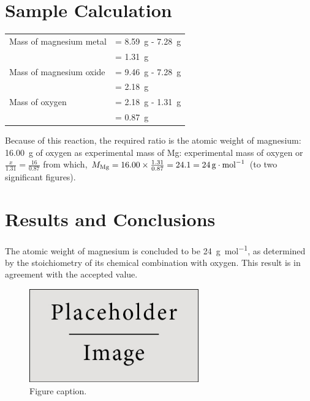 \documentclass{article}
\begin{document}
\section{Sample Calculation}

\begin{tabular}{ll}
Mass of magnesium metal & = \SI{8.59}{\gram} - \SI{7.28}{\gram}\\
& = \SI{1.31}{\gram}\\
Mass of magnesium oxide & = \SI{9.46}{\gram} - \SI{7.28}{\gram}\\
& = \SI{2.18}{\gram}\\
Mass of oxygen & = \SI{2.18}{\gram} - \SI{1.31}{\gram}\\
& = \SI{0.87}{\gram}
\end{tabular}

Because of this reaction, the required ratio is the atomic weight of magnesium: \SI{16.00}{\gram} of oxygen as experimental mass of Mg: experimental mass of oxygen or $\frac{x}{1.31}=\frac{16}{0.87}$ from which, $M_{\ce{Mg}} = 16.00 \times \frac{1.31}{0.87} = 24.1 = \SI{24}{\gram\per\mole}$ (to two significant figures).


\section{Results and Conclusions}

The atomic weight of magnesium is concluded to be \SI{24}{\gram\per\mol}, as determined by the stoichiometry of its chemical combination with oxygen. This result is in agreement with the accepted value.

\begin{figure}[h]
\begin{center}
\includegraphics[width=0.65\textwidth]{placeholder} %
\caption{Figure caption.}
\end{center}
\end{figure}
\end{document}
